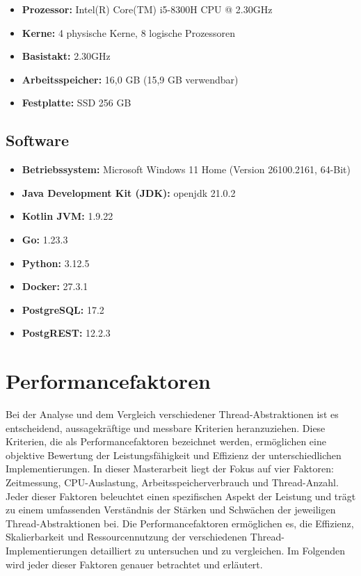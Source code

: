 \documentclass[fontsize=12pt,paper=a4,twoside=semi,parskip=half-,headsepline,headinclude]{scrreprt}
\begin{document}
\begin{itemize}
	\item \textbf{Prozessor:} Intel(R) Core(TM) i5-8300H CPU @ 2.30GHz
	\item[] \hspace{0.8cm}\textbf{Kerne:} 4 physische Kerne, 8 logische Prozessoren
	\item[] \hspace{0.8cm}\textbf{Basistakt:} 2.30GHz
	\item \textbf{Arbeitsspeicher:} 16,0 GB (15,9 GB verwendbar)
	\item \textbf{Festplatte:} SSD 256 GB
\end{itemize}

\subsection{Software}

\begin{itemize}
	\item \textbf{Betriebssystem:} Microsoft Windows 11 Home (Version 26100.2161, 64-Bit)
	\item \textbf{Java Development Kit (JDK):} openjdk 21.0.2
	\item \textbf{Kotlin JVM:} 1.9.22
	\item \textbf{Go:} 1.23.3
	\item \textbf{Python:} 3.12.5
	\item \textbf{Docker:} 27.3.1
	\item \textbf{PostgreSQL:} 17.2
	\item \textbf{PostgREST:} 12.2.3
\end{itemize}

\section{Performancefaktoren}

Bei der Analyse und dem Vergleich verschiedener Thread-Abstraktionen ist es entscheidend, aussagekräftige und messbare Kriterien heranzuziehen. Diese Kriterien, die als Performancefaktoren bezeichnet werden, ermöglichen eine objektive Bewertung der Leistungsfähigkeit und Effizienz der unterschiedlichen Implementierungen. In dieser Masterarbeit liegt der Fokus auf vier Faktoren: Zeitmessung, CPU-Auslastung, Arbeitsspeicherverbrauch und Thread-Anzahl. Jeder dieser Faktoren beleuchtet einen spezifischen Aspekt der Leistung und trägt zu einem umfassenden Verständnis der Stärken und Schwächen der jeweiligen Thread-Abstraktionen bei. Die Performancefaktoren ermöglichen es, die Effizienz, Skalierbarkeit und Ressourcennutzung der verschiedenen Thread-\-Imple\-mentie\-rungen detailliert zu untersuchen und zu vergleichen. Im Folgenden wird jeder dieser Faktoren genauer betrachtet und erläutert.
\end{document}
